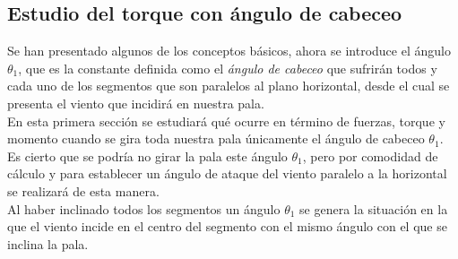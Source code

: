 




















\subsection{Estudio del torque con ángulo de cabeceo}
\label{section:torque_giro_inicial}

Se han presentado algunos de los conceptos básicos, ahora se introduce el ángulo $ \theta_1 $, que es la constante definida como el \textit{ángulo de cabeceo} que sufrirán todos y cada uno de los segmentos que son paralelos al plano horizontal, desde el cual se presenta el viento que incidirá en nuestra pala.\\


En esta primera sección se estudiará qué ocurre en término de fuerzas, torque y momento cuando se gira toda nuestra pala únicamente el ángulo de cabeceo $ \theta_1 $. \\


Es cierto que se podría no girar la pala este ángulo $ \theta_1 $, pero por comodidad de cálculo y para establecer un ángulo de ataque del viento paralelo a la horizontal se realizará de esta manera.\\


Al haber inclinado todos los segmentos un ángulo $ \theta_1 $ se genera la situación en la que el viento incide en el centro del segmento con el mismo ángulo con el que se inclina la pala. \\

